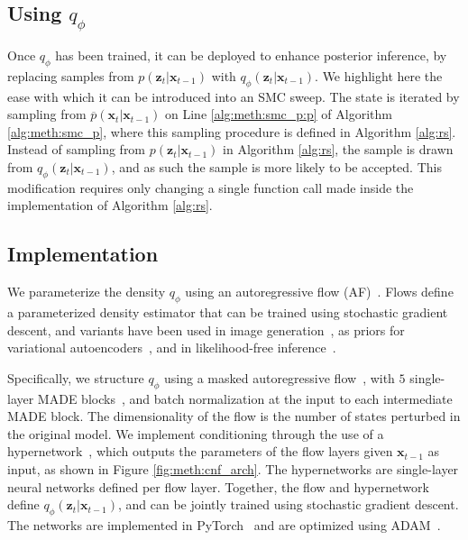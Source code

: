 

\subsection{Using $q_{\phi}$}
\label{sec:meth:using-q}
Once $q_{\phi}$ has been trained, it can be deployed to enhance posterior inference, by replacing samples from $p(\mathbf{z}_t | \mathbf{x}_{t-1})$ with $q_{\phi}(\mathbf{z}_t | \mathbf{x}_{t-1})$.
We highlight here the ease with which it can be introduced into an SMC sweep.
The state is iterated by sampling from $\overline{p}(\mathbf{x}_t | \mathbf{x}_{t-1})$ on Line \ref{alg:meth:smc_p:p} of Algorithm \ref{alg:meth:smc_p}, where this sampling procedure is defined in Algorithm \ref{alg:rs}.
Instead of sampling from $p(\mathbf{z}_{t} | \mathbf{x}_{t-1})$ in Algorithm \ref{alg:rs}, the sample is drawn from $q_{\phi}(\mathbf{z}_t | \mathbf{x}_{t-1})$, and as such the sample is more likely to be accepted.
This modification requires only changing a single function call made inside the implementation of Algorithm \ref{alg:rs}.

\subsection{Implementation}
\label{sec:meth:implementation}
We parameterize the density $q_{\phi}$ using an autoregressive flow (AF)~\citep{larochelle2011neural}.
Flows define a parameterized density estimator that can be trained using stochastic gradient descent, and variants have been used in image generation~\citep{kingma2018glow}, as priors for variational autoencoders~\citep{kingma2016improved}, and in likelihood-free inference~\citep{papamakarios2019sequential,lueckmann2019likelihood}.

Specifically, we structure $q_{\phi}$ using a masked autoregressive flow~\citep{papamakarios2017masked}, with $5$ single-layer MADE blocks~\citep{germain2015made}, and batch normalization at the input to each intermediate MADE block.
The dimensionality of the flow is the number of states perturbed in the original model. 
We implement conditioning through the use of a hypernetwork~\citep{ha2016hypernetworks}, which outputs the parameters of the flow layers given $\mathbf{x}_{t-1}$ as input, as shown in Figure \ref{fig:meth:cnf_arch}. 
The hypernetworks are single-layer neural networks defined per flow layer.
Together, the flow and hypernetwork define $q_{\phi}(\mathbf{z}_t|\mathbf{x}_{t-1})$, and can be jointly trained using stochastic gradient descent. 
The networks are implemented in PyTorch~\citep{paszke2017automatic} and are optimized using ADAM~\citep{kingma2014adam}.
